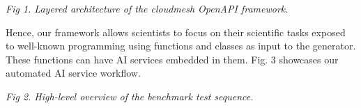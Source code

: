 \documentclass[letter,10pt]{article}
\begin{document}
\begin{multicols}{3}
\begin{center}
\end{center}

{\em Fig 1. Layered architecture of the cloudmesh Open\-API framework.}

\bigskip
Hence, our framework allows scientists to focus on their scientific tasks exposed to well-known programming using functions and classes as input to the generator. These functions can have AI services embedded in them. Fig. 3 showcases our automated AI service workflow. 



\begin{center}
\end{center}

{\em Fig 2. High-level overview of the benchmark test sequence.}



\end{multicols}
\end{document}
